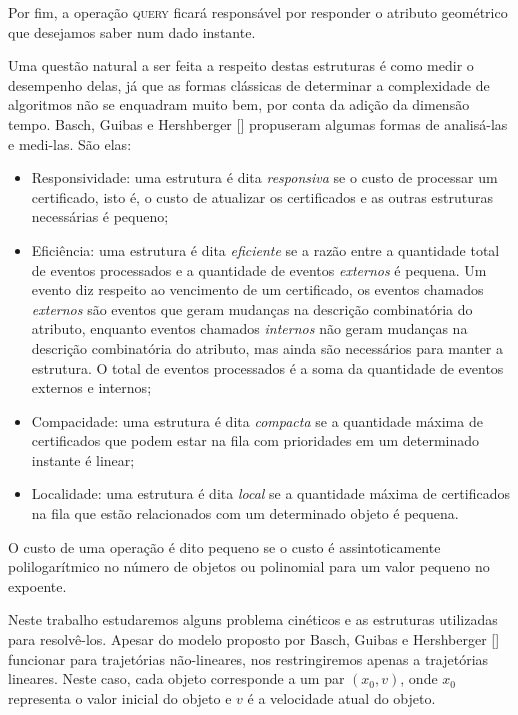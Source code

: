 Por fim, a operação \textsc{query} ficará responsável por responder o atributo
geométrico que desejamos saber num dado instante.

Uma questão natural a ser feita a respeito destas estruturas é como medir o
desempenho delas, já que as formas clássicas de determinar a complexidade de
algoritmos não se enquadram muito bem, por conta da adição da dimensão tempo. %
Basch, Guibas e Hershberger [\cite{BASCH19991}] propuseram algumas formas de analisá-las e medi-las.
São elas:
\begin{itemize}
    \item Responsividade: uma estrutura é dita \textit{responsiva} se o custo de
    processar um certificado, isto é, o custo de atualizar os certificados e as
    outras estruturas necessárias é pequeno;

    \item Eficiência: uma estrutura é dita \textit{eficiente} se a razão entre a
    quantidade total de eventos processados e a quantidade de eventos
    \textit{externos} é pequena.
    Um evento diz respeito ao vencimento de um certificado, os eventos chamados
    \textit{externos} são eventos que geram mudanças na descrição combinatória do atributo,
    enquanto eventos chamados \textit{internos} não geram mudanças na descrição combinatória
    do atributo, mas ainda são necessários para manter a estrutura.
    O total de eventos processados é a soma da quantidade de eventos externos e internos;

    \item Compacidade: uma estrutura é dita \textit{compacta} se a quantidade máxima de
    certificados que podem estar na fila com prioridades em um determinado instante é linear;

    \item Localidade: uma estrutura é dita \textit{local} se a quantidade máxima
    de certificados na fila que estão relacionados com um determinado objeto é
    pequena.
\end{itemize}

O custo de uma operação é dito pequeno se o custo é assintoticamente
polilogarítmico no número de objetos ou polinomial para um valor pequeno no expoente.

Neste trabalho estudaremos alguns problema cinéticos e as estruturas utilizadas
para resolvê-los.
Apesar do modelo proposto por Basch, Guibas e Hershberger [\cite{BASCH19991}]
funcionar para trajetórias não-lineares, nos restringiremos apenas a trajetórias
lineares.
Neste caso, cada objeto corresponde a um par $(x_0, v)$, onde $x_0$ representa
o valor inicial do objeto e $v$ é a velocidade atual do objeto.


